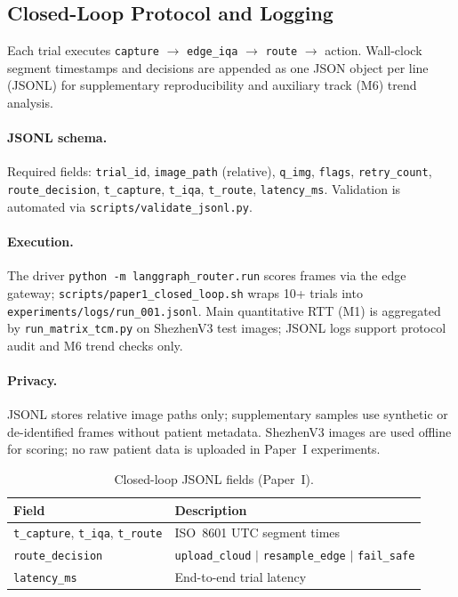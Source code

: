 \subsection{Closed-Loop Protocol and Logging}
\label{sec:closed-loop}

Each trial executes \texttt{capture} $\rightarrow$ \texttt{edge\_iqa} $\rightarrow$ \texttt{route} $\rightarrow$ action. Wall-clock segment timestamps and decisions are appended as one JSON object per line (JSONL) for supplementary reproducibility and auxiliary track (M6) trend analysis.

\paragraph{JSONL schema.}
Required fields: \texttt{trial\_id}, \texttt{image\_path} (relative), \texttt{q\_img}, \texttt{flags}, \texttt{retry\_count}, \texttt{route\_decision}, \texttt{t\_capture}, \texttt{t\_iqa}, \texttt{t\_route}, \texttt{latency\_ms}. Validation is automated via \texttt{scripts/validate\_jsonl.py}.

\paragraph{Execution.}
The driver \texttt{python -m langgraph\_router.run} scores frames via the edge gateway; \texttt{scripts/paper1\_closed\_loop.sh} wraps 10+ trials into \texttt{experiments/logs/run\_001.jsonl}.
Main quantitative RTT (M1) is aggregated by \texttt{run\_matrix\_tcm.py} on ShezhenV3 test images; JSONL logs support protocol audit and M6 trend checks only.

\paragraph{Privacy.}
JSONL stores relative image paths only; supplementary samples use synthetic or de-identified frames without patient metadata.
ShezhenV3 images are used offline for scoring; no raw patient data is uploaded in Paper~I experiments.

\begin{table}[t]
\centering
\caption{Closed-loop JSONL fields (Paper~I).}
\begin{tabular}{ll}
\hline
Field & Description \\
\hline
\texttt{t\_capture}, \texttt{t\_iqa}, \texttt{t\_route} & ISO~8601 UTC segment times \\
\texttt{route\_decision} & \texttt{upload\_cloud} $|$ \texttt{resample\_edge} $|$ \texttt{fail\_safe} \\
\texttt{latency\_ms} & End-to-end trial latency \\
\hline
\end{tabular}
\end{table}
